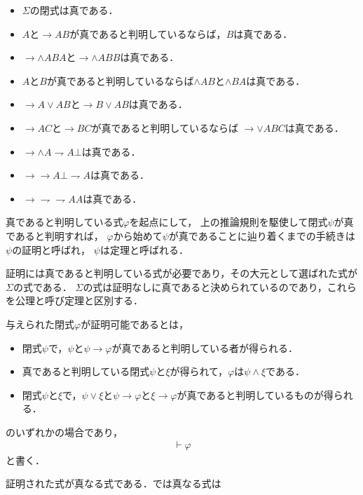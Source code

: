 \documentclass[a4j,10.5pt,oneside,openany]{jsbook}
\theoremstyle{mystyle}
\begin{document}
	\begin{itemize}
		\item $\Sigma$の閉式は真である．
		\item $A$と$\rightarrow AB$が真であると判明しているならば，$B$は真である．
		\item $\rightarrow \wedge ABA$と$\rightarrow \wedge ABB$は真である．
		\item $A$と$B$が真であると判明しているならば$\wedge AB$と$\wedge BA$は真である．
		\item $\rightarrow A\vee AB$と$\rightarrow B \vee AB$は真である．
		\item $\rightarrow AC$と$\rightarrow BC$が真であると判明しているならば
			$\rightarrow \vee ABC$は真である．
		\item $\rightarrow\wedge A \rightharpoondown A \bot$は真である．
		\item $\rightarrow \rightarrow A \bot \rightharpoondown A$は真である．
		\item $\rightarrow \rightharpoondown\rightharpoondown AA$は真である．
	\end{itemize}
	
	真であると判明している式$\varphi$を起点にして，
	上の推論規則を駆使して閉式$\psi$が真であると判明すれば，
	$\varphi$から始めて$\psi$が真であることに辿り着くまでの手続きは$\psi$の証明と呼ばれ，
	$\psi$は定理と呼ばれる．
	
	証明には真であると判明している式が必要であり，その大元として選ばれた式が$\Sigma$の式である．
	$\Sigma$の式は証明なしに真であると決められているのであり，これらを公理と呼び定理と区別する．
	
	与えられた閉式$\varphi$が証明可能であるとは，
	\begin{itemize}
		\item 閉式$\psi$で，$\psi$と$\psi \rightarrow \varphi$が真であると判明している者が得られる．
		\item 真であると判明している閉式$\psi$と$\xi$が得られて，$\varphi$は$\psi \wedge \xi$である．
		\item 閉式$\psi$と$\xi$で，$\psi \vee \xi$と$\psi \rightarrow \varphi$と$\xi \rightarrow \varphi$が真であると判明しているものが得られる．
	\end{itemize}
	
	のいずれかの場合であり，
	\begin{align}
		\vdash \varphi
	\end{align}
	と書く．
	
	証明された式が真なる式である．では真なる式は
\end{document}
